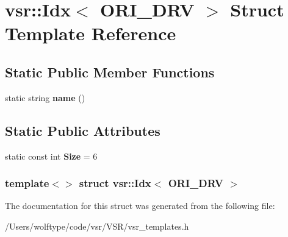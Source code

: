 \hypertarget{structvsr_1_1_idx_3_01_o_r_i___d_r_v_01_4}{\section{vsr\-:\-:Idx$<$ O\-R\-I\-\_\-\-D\-R\-V $>$ Struct Template Reference}
\label{structvsr_1_1_idx_3_01_o_r_i___d_r_v_01_4}
}
\subsection*{Static Public Member Functions}
\begin{DoxyCompactItemize}
\item 
\hypertarget{structvsr_1_1_idx_3_01_o_r_i___d_r_v_01_4_a0d324b68a155a418d70d4e96c19ff01c}{static string {\bfseries name} ()}\label{structvsr_1_1_idx_3_01_o_r_i___d_r_v_01_4_a0d324b68a155a418d70d4e96c19ff01c}

\end{DoxyCompactItemize}
\subsection*{Static Public Attributes}
\begin{DoxyCompactItemize}
\item 
\hypertarget{structvsr_1_1_idx_3_01_o_r_i___d_r_v_01_4_a3710b4df469bda7fc10e3b3e284ddb2d}{static const int {\bfseries Size} = 6}\label{structvsr_1_1_idx_3_01_o_r_i___d_r_v_01_4_a3710b4df469bda7fc10e3b3e284ddb2d}

\end{DoxyCompactItemize}
\subsubsection*{template$<$$>$ struct vsr\-::\-Idx$<$ O\-R\-I\-\_\-\-D\-R\-V $>$}



The documentation for this struct was generated from the following file\-:\begin{DoxyCompactItemize}
\item 
/\-Users/wolftype/code/vsr/\-V\-S\-R/vsr\-\_\-templates.\-h\end{DoxyCompactItemize}
